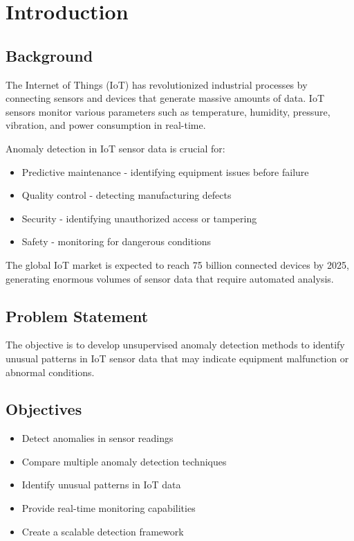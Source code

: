 \documentclass[12pt,a4paper]{report}
\begin{document}
\tableofcontents
\newpage

\listoffigures
{}

\listoftables
{}

\chapter{Introduction}

\section{Background}
The Internet of Things (IoT) has revolutionized industrial processes by connecting sensors and devices that generate massive amounts of data. IoT sensors monitor various parameters such as temperature, humidity, pressure, vibration, and power consumption in real-time.

Anomaly detection in IoT sensor data is crucial for:
\begin{itemize}
    \item Predictive maintenance - identifying equipment issues before failure
    \item Quality control - detecting manufacturing defects
    \item Security - identifying unauthorized access or tampering
    \item Safety - monitoring for dangerous conditions
\end{itemize}

The global IoT market is expected to reach 75 billion connected devices by 2025, generating enormous volumes of sensor data that require automated analysis.

\section{Problem Statement}
The objective is to develop unsupervised anomaly detection methods to identify unusual patterns in IoT sensor data that may indicate equipment malfunction or abnormal conditions.

\section{Objectives}
\begin{itemize}
    \item Detect anomalies in sensor readings
    \item Compare multiple anomaly detection techniques
    \item Identify unusual patterns in IoT data
    \item Provide real-time monitoring capabilities
    \item Create a scalable detection framework
\end{itemize}
\end{document}
